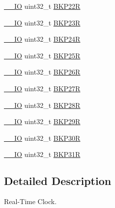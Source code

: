\begin{DoxyCompactItemize}
\mbox{\hyperlink{core__sc300_8h_aec43007d9998a0a0e01faede4133d6be}{\+\_\+\+\_\+\+IO}} uint32\+\_\+t \mbox{\hyperlink{struct_r_t_c___type_def_a679ec46535cae5149dc4d84e7c5d985c}{B\+K\+P22R}}
\item 
\mbox{\hyperlink{core__sc300_8h_aec43007d9998a0a0e01faede4133d6be}{\+\_\+\+\_\+\+IO}} uint32\+\_\+t \mbox{\hyperlink{struct_r_t_c___type_def_a7836b793c4ecc58a27733329f26550a7}{B\+K\+P23R}}
\item 
\mbox{\hyperlink{core__sc300_8h_aec43007d9998a0a0e01faede4133d6be}{\+\_\+\+\_\+\+IO}} uint32\+\_\+t \mbox{\hyperlink{struct_r_t_c___type_def_abfe68a89c3a7c2620bb0f286d3f58eea}{B\+K\+P24R}}
\item 
\mbox{\hyperlink{core__sc300_8h_aec43007d9998a0a0e01faede4133d6be}{\+\_\+\+\_\+\+IO}} uint32\+\_\+t \mbox{\hyperlink{struct_r_t_c___type_def_a052e275100e4b202808fa4bbe9d5515d}{B\+K\+P25R}}
\item 
\mbox{\hyperlink{core__sc300_8h_aec43007d9998a0a0e01faede4133d6be}{\+\_\+\+\_\+\+IO}} uint32\+\_\+t \mbox{\hyperlink{struct_r_t_c___type_def_aaa12210df2df47a6276270a2b7b2d038}{B\+K\+P26R}}
\item 
\mbox{\hyperlink{core__sc300_8h_aec43007d9998a0a0e01faede4133d6be}{\+\_\+\+\_\+\+IO}} uint32\+\_\+t \mbox{\hyperlink{struct_r_t_c___type_def_a5879b0d3796b1c291f64dbaa57653624}{B\+K\+P27R}}
\item 
\mbox{\hyperlink{core__sc300_8h_aec43007d9998a0a0e01faede4133d6be}{\+\_\+\+\_\+\+IO}} uint32\+\_\+t \mbox{\hyperlink{struct_r_t_c___type_def_abd26829bfe028b5882d523e7035eb497}{B\+K\+P28R}}
\item 
\mbox{\hyperlink{core__sc300_8h_aec43007d9998a0a0e01faede4133d6be}{\+\_\+\+\_\+\+IO}} uint32\+\_\+t \mbox{\hyperlink{struct_r_t_c___type_def_aa240211cf23c5822f4ac9c690a7a248c}{B\+K\+P29R}}
\item 
\mbox{\hyperlink{core__sc300_8h_aec43007d9998a0a0e01faede4133d6be}{\+\_\+\+\_\+\+IO}} uint32\+\_\+t \mbox{\hyperlink{struct_r_t_c___type_def_a32b51e2f18c68ea5af816d1f231b7ec6}{B\+K\+P30R}}
\item 
\mbox{\hyperlink{core__sc300_8h_aec43007d9998a0a0e01faede4133d6be}{\+\_\+\+\_\+\+IO}} uint32\+\_\+t \mbox{\hyperlink{struct_r_t_c___type_def_a4bccd0b2feecc2e2159898857bab6d89}{B\+K\+P31R}}
\end{DoxyCompactItemize}


\subsection{Detailed Description}
Real-\/\+Time Clock. 

